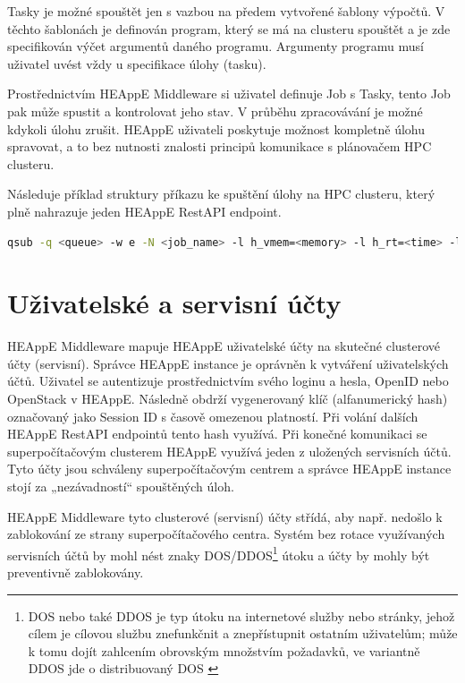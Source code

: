 Tasky je možné spouštět jen s vazbou na předem vytvořené šablony výpočtů. V těchto šablonách je definován program, který se má na clusteru spouštět a je zde specifikován výčet argumentů daného programu. Argumenty programu musí uživatel uvést vždy u specifikace úlohy (tasku).

Prostřednictvím HEAppE Middleware si uživatel definuje Job s Tasky, tento Job pak může spustit a kontrolovat jeho stav. V průběhu zpracovávání je možné kdykoli úlohu zrušit. HEAppE uživateli poskytuje možnost kompletně úlohu spravovat, a to bez nutnosti znalosti principů komunikace s plánovačem HPC clusteru.

Následuje příklad struktury příkazu ke spuštění úlohy na HPC clusteru, který plně nahrazuje jeden HEAppE RestAPI endpoint.

\begin{lstlisting}[language=bash,caption={Struktura příkazu qsub \cite{iR8VZfeCCZ757gs1}}]
qsub -q <queue> -w e -N <job_name> -l h_vmem=<memory> -l h_rt=<time> -l s_rt=<time> -pe smp <num_slots> -o <outputlogfile> -e <errorlogfile> <pathtoScript> <arg1> <arg2>
\end{lstlisting}

\section{Uživatelské a servisní účty}
HEAppE Middleware mapuje HEAppE uživatelské účty na skutečné clusterové účty (servisní). Správce HEAppE instance je oprávněn k vytváření uživatelských účtů. Uživatel se autentizuje prostřednictvím svého loginu a hesla, OpenID nebo OpenStack v HEAppE. Následně obdrží vygenerovaný klíč (alfanumerický hash) označovaný jako Session ID s časově omezenou platností. Při volání dalších HEAppE RestAPI endpointů tento hash využívá. Při konečné komunikaci se superpočítačovým clusterem HEAppE využívá jeden z uložených servisních účtů. Tyto účty jsou schváleny superpočítačovým centrem a správce HEAppE instance stojí za „nezávadností“ spouštěných úloh. 

HEAppE Middleware tyto clusterové (servisní) účty střídá, aby např. nedošlo k zablokování ze strany superpočítačového centra. Systém bez rotace využívaných servisních účtů by mohl nést znaky DOS/DDOS\footnote{DOS nebo také DDOS je typ útoku na internetové služby nebo stránky, jehož cílem je cílovou službu znefunkčnit a znepřístupnit ostatním uživatelům; může k tomu dojít zahlcením obrovským množstvím požadavků, ve variantně DDOS jde o distribuovaný DOS \cite{UUBpn6UTaV8mOipc}} útoku a účty by mohly být preventivně zablokovány.

